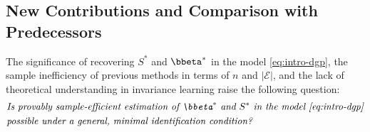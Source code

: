 \documentclass[10pt]{article}
\numberwithin{equation}{section}
\begin{document}
{\subsection{New Contributions and Comparison with Predecessors}

The significance of recovering $S^*$ and $\bbeta^*$ in the model \eqref{eq:intro-dgp}, the sample inefficiency of previous methods in terms of $n$ and $|\mathcal{E}|$, and the lack of theoretical understanding in invariance learning raise the following question:
\begin{align*}
    \begin{split}
    &\text{\it Is provably sample-efficient estimation of $\bbeta^*$ and $S^*$ in the model \eqref{eq:intro-dgp}}\\
    &\text{\it possible under a general, minimal identification condition?} \\
    \end{split}
\end{align*}

}
\end{document}
